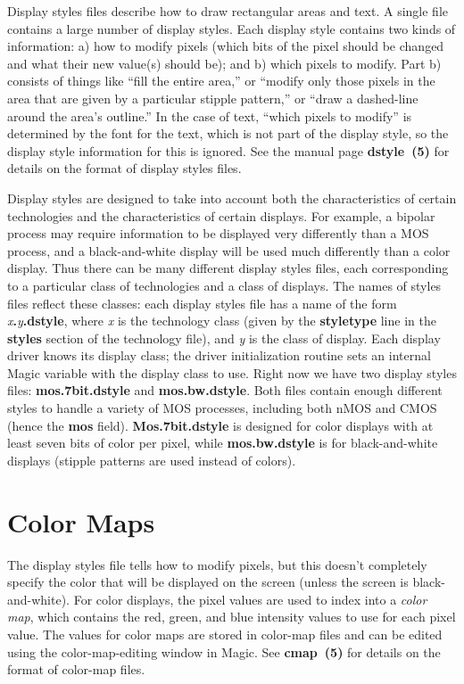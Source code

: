 \documentclass[letterpaper,twoside,12pt]{article}
\begin{document}
Display styles files describe how to draw rectangular areas
and text.  A single file contains a large number of display
styles.  Each display style contains two kinds of
information:  a) how to modify pixels (which bits of
the pixel should be changed and what their new value(s) should
be); and b) which pixels to modify.  Part b) consists of
things like ``fill the entire area,'' or ``modify only those
pixels in the area that are given by a particular stipple pattern,''
or ``draw a dashed-line around the area's outline.''
In the case of text, ``which pixels to modify'' is determined
by the font for the text, which is not part of the display
style, so the display style information for this is ignored.
See the manual page {\bfseries dstyle~(5)} for details on the format
of display styles files.

Display styles are designed to take into account both the characteristics
of certain technologies and the characteristics of certain displays.
For example, a bipolar process may require information to be displayed
very differently than a MOS process, and a black-and-white display
will be used much differently than a color display.  Thus there can
be many different display styles files, each corresponding to a particular
class of technologies and a class of displays.  The names of styles
files reflect these classes:  each display styles file has a name of
the form {\itshape x}{\bfseries .}{\itshape y}{\bfseries .dstyle},
where {\itshape x} is the technology
class (given by the {\bfseries styletype} line in the {\bfseries styles}
section of the technology file), and {\itshape y} is the class of display.
Each display driver knows its display class;  the driver initialization
routine sets an internal Magic variable with the display class to
use.  Right now we have two display styles files:  {\bfseries mos.7bit.dstyle}
and {\bfseries mos.bw.dstyle}.  Both files contain enough different
styles to handle a variety of MOS processes, including both nMOS
and CMOS (hence the {\bfseries mos} field).  {\bfseries Mos.7bit.dstyle} is
designed for color displays with at least seven bits of color per
pixel, while {\bfseries mos.bw.dstyle} is for black-and-white displays
(stipple patterns are used instead of colors).

\section{Color Maps}

The display styles file tells how to modify pixels, but this doesn't
completely specify the color that will be displayed on the screen
(unless the screen is black-and-white).  For color displays, the
pixel values are used to index into a {\itshape color map}, which contains
the red, green, and blue intensity values to use for each pixel
value.  The values for color maps are stored in color-map files
and can be edited using the color-map-editing window in Magic.
See {\bfseries cmap~(5)} for details on the format of color-map files.
\end{document}
